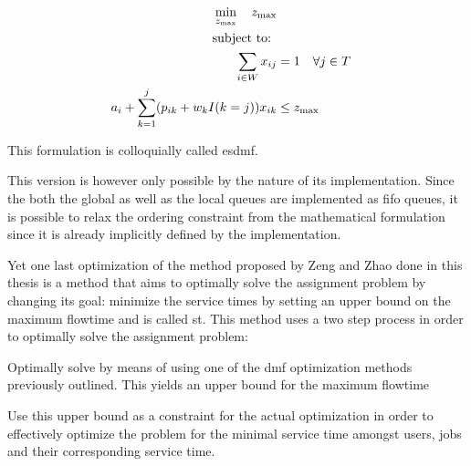 \documentclass{seal_thesis}
\begin{document}
\begin{align}
    \min_{z_{\text{max}}} \quad z_{\text{max}}\\
    \text{subject to: } \notag \\
    \sum_{i \in W} x_{ij} &= 1 \quad \forall j \in T\\
    a_i + \sum_{k=1}^j (p_{ik} + w_k I(k=j))x_{ik} &\leq z_{\text{max}}
\end{align}

This formulation is colloquially called \gls{esdmf}.

This version is however only possible by the nature of its implementation. Since the both the global as well as the local queues are implemented as \gls{fifo} queues, it is possible to relax the ordering constraint from the mathematical formulation since it is already implicitly defined by the implementation.

Yet one last optimization of the method proposed by Zeng and Zhao done in this thesis is a method that aims to optimally solve the assignment problem by changing its goal: minimize the service times by setting an upper bound on the maximum flowtime and is called \gls{st}. This method uses a two step process in order to optimally solve the assignment problem:
\begin{enumerate*}
	\item Optimally solve by means of using one of the \gls{dmf} optimization methods previously outlined. This yields an upper bound for the maximum flowtime
	\item Use this upper bound as a constraint for the actual optimization in order to effectively optimize the problem for the minimal service time amongst users, jobs and their corresponding service time.
\end{enumerate*}
\end{document}
